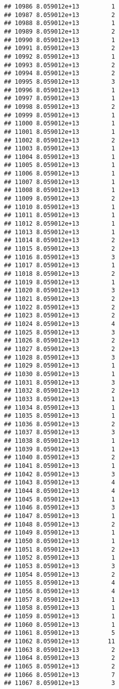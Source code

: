\documentclass[
]{article}
\begin{document}
\begin{verbatim}
## 10986 8.059012e+13         1
## 10987 8.059012e+13         2
## 10988 8.059012e+13         1
## 10989 8.059012e+13         2
## 10990 8.059012e+13         1
## 10991 8.059012e+13         2
## 10992 8.059012e+13         1
## 10993 8.059012e+13         2
## 10994 8.059012e+13         2
## 10995 8.059012e+13         3
## 10996 8.059012e+13         1
## 10997 8.059012e+13         1
## 10998 8.059012e+13         2
## 10999 8.059012e+13         1
## 11000 8.059012e+13         1
## 11001 8.059012e+13         1
## 11002 8.059012e+13         2
## 11003 8.059012e+13         1
## 11004 8.059012e+13         1
## 11005 8.059012e+13         1
## 11006 8.059012e+13         1
## 11007 8.059012e+13         1
## 11008 8.059012e+13         1
## 11009 8.059012e+13         2
## 11010 8.059012e+13         1
## 11011 8.059012e+13         1
## 11012 8.059012e+13         1
## 11013 8.059012e+13         1
## 11014 8.059012e+13         2
## 11015 8.059012e+13         2
## 11016 8.059012e+13         3
## 11017 8.059012e+13         1
## 11018 8.059012e+13         2
## 11019 8.059012e+13         1
## 11020 8.059012e+13         3
## 11021 8.059012e+13         2
## 11022 8.059012e+13         2
## 11023 8.059012e+13         2
## 11024 8.059012e+13         4
## 11025 8.059012e+13         3
## 11026 8.059012e+13         2
## 11027 8.059012e+13         2
## 11028 8.059012e+13         3
## 11029 8.059012e+13         1
## 11030 8.059012e+13         1
## 11031 8.059012e+13         3
## 11032 8.059012e+13         2
## 11033 8.059012e+13         1
## 11034 8.059012e+13         1
## 11035 8.059012e+13         1
## 11036 8.059012e+13         2
## 11037 8.059012e+13         3
## 11038 8.059012e+13         1
## 11039 8.059012e+13         1
## 11040 8.059012e+13         2
## 11041 8.059012e+13         1
## 11042 8.059012e+13         3
## 11043 8.059012e+13         4
## 11044 8.059012e+13         4
## 11045 8.059012e+13         1
## 11046 8.059012e+13         3
## 11047 8.059012e+13         1
## 11048 8.059012e+13         2
## 11049 8.059012e+13         1
## 11050 8.059012e+13         1
## 11051 8.059012e+13         2
## 11052 8.059012e+13         1
## 11053 8.059012e+13         3
## 11054 8.059012e+13         2
## 11055 8.059012e+13         4
## 11056 8.059012e+13         4
## 11057 8.059012e+13         1
## 11058 8.059012e+13         1
## 11059 8.059012e+13         1
## 11060 8.059012e+13         1
## 11061 8.059012e+13         5
## 11062 8.059012e+13        11
## 11063 8.059012e+13         2
## 11064 8.059012e+13         2
## 11065 8.059012e+13         2
## 11066 8.059012e+13         7
## 11067 8.059012e+13         3

\end{verbatim}
\end{document}
